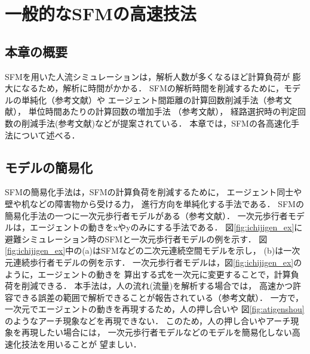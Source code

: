 \chapter{一般的なSFMの高速技法}
\label{sec:survey}
\section{本章の概要}
SFMを用いた人流シミュレーションは，解析人数が多くなるほど計算負荷が
膨大になるため，解析に時間がかかる．
SFMの解析時間を削減するために，モデルの単純化（参考文献）や
エージェント間距離の計算回数削減手法（参考文献），
単位時間あたりの計算回数の増加手法 （参考文献），
経路選択時の判定回数の削減手法(参考文献)などが提案されている．
本章では，SFMの各高速化手法について述べる．

\section{モデルの簡易化}
SFMの簡易化手法は，SFMの計算負荷を削減するために，
エージェント同士や壁や机などの障害物から受ける力，
進行方向を単純化する手法である．
SFMの簡易化手法の一つに一次元歩行者モデルがある（参考文献）．
一次元歩行者モデルは，エージェントの動きをxやyのみにする手法である．
図\ref{fig:ichijigen_ex}に避難シミュレーション時のSFMと一次元歩行者モデルの例を示す．
図\ref{fig:ichijigen_ex}中の(a)はSFMなどの二次元連続空間モデルを示し，
(b)は一次元連続歩行者モデルの例を示す．
一次元歩行者モデルは，図\ref{fig:ichijigen_ex}のように，エージェントの動きを
算出する式を一次元に変更することで，計算負荷を削減できる．
本手法は，人の流れ(流量)を解析する場合では，
高速かつ許容できる誤差の範囲で解析できることが報告されている（参考文献）．
一方で，一次元でエージェントの動きを再現するため，人の押し合いや
図\ref{fig:atigenshou}のようなアーチ現象などを再現できない．
このため，人の押し合いやアーチ現象を再現したい場合には，
一次元歩行者モデルなどのモデルを簡易化しない高速化技法を用いることが
望ましい．


